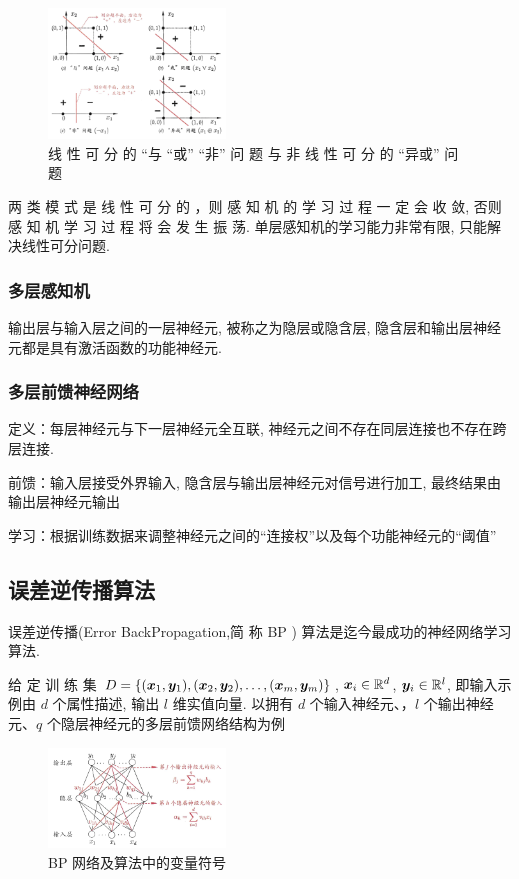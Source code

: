 \begin{figure}[!htb]
    \centering
    \includegraphics[width=0.42\textwidth]{pic/ML5/线 性 可 分 的 “与 “或” “非” 问 题 与 非 线 性 可 分 的 “异或” 问题}
    \caption{线 性 可 分 的 “与 “或” “非” 问 题 与 非 线 性 可 分 的 “异或” 问题}
\end{figure}

两 类 模 式 是 线 性 可 分 的 ，则 感 知 机 的 学 习 过 程 一 定 会 收 敛,  否则 感 知 机 学 习 过 程 将 会 发 生 振 荡. 单层感知机的学习能力非常有限, 只能解决线性可分问题.

\subsubsection{多层感知机}
输出层与输入层之间的一层神经元, 被称之为隐层或隐含层, 隐含层和输出层神经元都是具有激活函数的功能神经元. 

\subsubsection{多层前馈神经网络}
定义：每层神经元与下一层神经元全互联, 神经元之间不存在同层连接也不存在跨层连接.

前馈：输入层接受外界输入, 隐含层与输出层神经元对信号进行加工, 最终结果由输出层神经元输出

学习：根据训练数据来调整神经元之间的“连接权”以及每个功能神经元的“阈值”

\subsection{误差逆传播算法}
误差逆传播(Error BackPropagation,简 称 BP ) 算法是迄今最成功的神经网络学习算法. 

给 定 训 练 集 $D=\{ (\bm{x}_1, \bm{y}_1), (\bm{x}_2,\bm{y}_2),\dots,(\bm{x}_m,\bm{y}_m) \}$, $\bm{x}_i\in\mathbb{R}^d$, $\bm{y}_i\in\mathbb{R}^l$, 即输入示例由 $d$ 个属性描述, 输出 $l$ 维实值向量. 以拥有 $d$ 个输入神经元、，$l$ 个输出神经元、$q$ 个隐层神经元的多层前馈网络结构为例

\begin{figure}[!htb]
    \centering
    \includegraphics[width=0.42\textwidth]{pic/ML5/B P 网络及算法中的变量符号}
    \caption{BP 网络及算法中的变量符号}
\end{figure}

